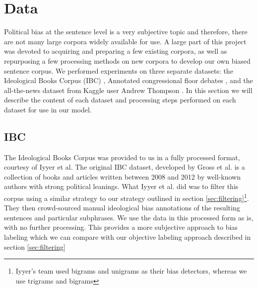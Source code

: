 \documentclass[10pt,a4paper,onecolumn]{article}
\begin{document}
\newpage

\section{Data}
\label{sec:data}
Political bias at the sentence level is a very subjective topic and therefore, there are not many large corpora widely available for use. A large part of this project was devoted to acquiring and preparing a few existing corpora, as well as repurposing a few processing methods on new corpora to develop our own biased sentence corpus. We performed experiments on three separate datasets: the Ideological Books Corpus (IBC) \cite{iyyerRNN}, Annotated congressional floor debates \cite{convote}, and the all-the-news dataset from Kaggle user Andrew Thompson \cite{news}. In this section we will describe the content of each dataset and processing steps performed on each dataset for use in our model.

\subsection{IBC}
The Ideological Books Corpus was provided to us in a fully processed format, courtesy of Iyyer et al.\cite{iyyerRNN} The original IBC dataset, developed by Gross et al.\cite{gross2013ibc} is a collection of books and articles written between 2008 and 2012 by well-known authors with strong political leanings. What Iyyer et al. did was to filter this corpus using a similar strategy to our strategy outlined in section \ref{sec:filtering}\footnote{Iyyer's team used bigrams and unigrams as their bias detectors, whereas we use trigrams and bigrams}. They then crowd-sourced manual ideological bias annotations of the resulting sentences and particular subphrases. We use the data in this processed form as is, with no further processing. This provides a more subjective approach to bias labeling which we can compare with our objective labeling approach described in section \ref{sec:filtering}
\end{document}
